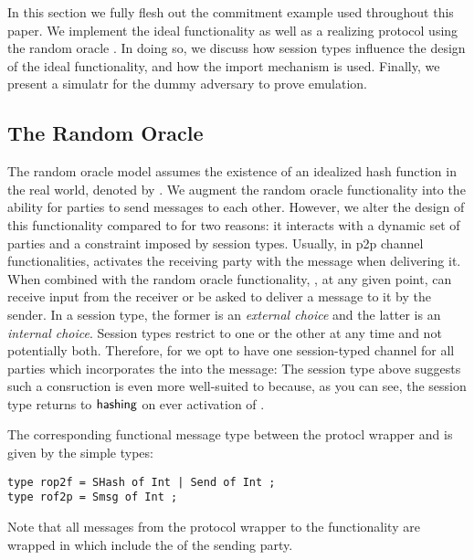 In this section we fully flesh out the commitment example used throughout this paper.
We implement the ideal functionality \Fcom as well as a realizing protocol  using the random oracle \Fro.
In doing so, we discuss how session types influence the design of the ideal functionality, and how the import mechanism is used. 
Finally, we present a simulatr for the dummy adversary to prove emulation.

\subsection{The Random Oracle}
The random oracle model assumes the existence of an idealized hash function in the real world, denoted by \Fro.
We augment the random oracle functionality into \Fropp the ability for parties to send messages to each other. 
However, we alter the design of this functionality compared to \Fcom for two reasons: it interacts with a dynamic set of parties and a constraint imposed by session types.
Usually, in p2p channel functionalities, \F activates the receiving party with the message when delivering it.
When combined with the random oracle functionality, \Fropp, at any given point, can receive input from the receiver or be asked to deliver a message to it by the sender. 
In a session type, the former is an \emph{external choice} and the latter is an \emph{internal choice}. 
Session types restrict to one or the other at any time and not potentially both. 
Therefore, for \Fropp we opt to have one session-typed channel for all parties which incorporates the  into the message:
The session type above suggests such a consruction is even more well-suited to \Fropp because, as you can see, the session type returns to $\mathsf{hashing}$ on ever activation of \Fropp.

The corresponding functional message type between the protocl wrapper and \Fropp is given by the simple types:
\begin{lstlisting}[basicstyle=\small\BeraMonottFamily, mathescape]
type rop2f = SHash of Int | Send of Int ;
type rof2p = Smsg of Int ;
\end{lstlisting}
Note that all messages from the protocol wrapper to the functionality are wrapped in  which include the  of the sending party.

